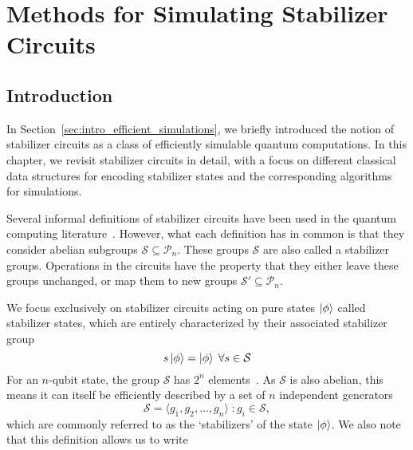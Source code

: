 
\chapter[Methods for Simulating Stabilizer Circuits]{Methods for Simulating Stabilizer\\ Circuits}
\label{chap:stabilizers}

\section{Introduction}\label{sec:stabilizer-intro}
In Section~\ref{sec:intro_efficient_simulations}, we briefly introduced the notion of stabilizer circuits as a class of efficiently simulable quantum computations. In this chapter, we revisit stabilizer circuits in detail, with a focus on different classical data structures for encoding stabilizer states and the corresponding algorithms for simulations.\par
Several informal definitions of stabilizer circuits have been used in the quantum computing literature~\cite{VandenNest2008,Gottesman1998b,Aaronson2004,Seddon2019}. However, what each definition has in common is that they consider abelian subgroups $\mathcal{S} \subseteq \mathcal{P}_{n}$. These groups $\mathcal{S}$ are also called a stabilizer groups. Operations in the circuits have the property that they either leave these groups unchanged, or map them to new groups $\mathcal{S'}\subseteq \mathcal{P}_{n}$.\par
We focus exclusively on stabilizer circuits acting on pure states $\ket{\phi}$ called stabilizer states, which are entirely characterized by their associated stabilizer group
\begin{equation}
    s\ket{\phi}=\ket{\phi}\;\forall s\in\mathcal{S}
\end{equation}
For an $n$-qubit state, the group $\mathcal{S}$ has $2^{n}$ elements~\cite{Gottesman1998b}. As $\mathcal{S}$ is also abelian, this means it can itself be efficiently described by a set of $n$ independent generators
\begin{equation}
    \mathcal{S} = \langle g_{1}, g_{2},\dots,g_{n}\rangle \; : g_{i}\in\mathcal{S},
\end{equation}
which are commonly referred to as the `stabilizers' of the state $\ket{\phi}$. We also note that this definition allows us to write
